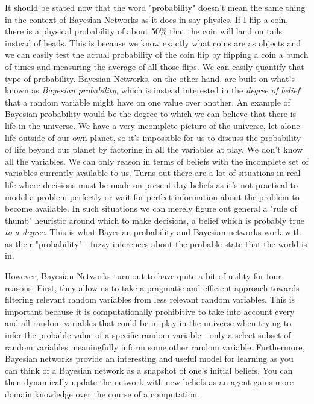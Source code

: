 \documentclass[a4paper,12pt]{article}
\begin{document}
  It should be stated now that the word "probability" doesn't mean the same thing in the context of Bayesian Networks as it does in say physics. If I flip a coin, there is a physical probability of about 50\% that the coin will land on tails instead of heads. This is because we know exactly what coins are as objects and we can easily test the actual probability of the coin flip by flipping a coin a bunch of times and measuring the average of all those flips. We can easily quantify that type of probability. Bayesian Networks, on the other hand, are built on what's known as \emph{Bayesian probability}, which is instead interested in the \emph{degree of belief} that a random variable might have on one value over another. An example of Bayesian probability would be the degree to which we can believe that there is life in the universe. We have a very incomplete picture of the universe, let alone life outside of our own planet, so it's impossible for us to discuss the probability of life beyond our planet by factoring in all the variables at play. We don't know all the variables. We can only reason in terms of beliefs with the incomplete set of variables currently available to us. Turns out there are a lot of situations in real life where decisions must be made on present day beliefs as it's not practical to model a problem perfectly or wait for perfect information about the problem to become available. In such situations we can merely figure out general a "rule of thumb" heuristic around which to make decisions, a belief which is probably true \emph{to a degree}. This is what Bayesian probability and Bayesian networks work with as their "probability" - fuzzy inferences about the probable state that the world is in.

However, Bayesian Networks turn out to have quite a bit of utility for four reasons\cite{Heckerman08}. First, they allow us to take a pragmatic and efficient approach towards filtering relevant random variables from less relevant random variables. This is important because it is computationally prohibitive to take into account every and all random variables that could be in play in the universe when trying to infer the probable value of a specific random variable - only a select subset of random variables meaningfully inform some other random variable. Furthermore, Bayesian networks provide an interesting and useful model for learning as you can think of a Bayesian network as a snapshot of one's initial beliefs.\cite{HeckermanGC95} You can then dynamically update the network with new beliefs as an agent gains more domain knowledge over the course of a computation.\cite{murphy02} 
\end{document}
